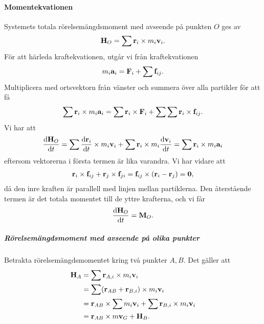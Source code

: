 \paragraph{Momentekvationen}
Systemets totala rörelsemängdsmoment med avseende på punkten $O$ ges av
\begin{align*}
	\vb{H}_{O} = \sum\vb{r}_{i}\times m_{i}\vb{v}_{i}.
\end{align*}
För att härleda kraftekvationen, utgår vi från kraftekvationen
\begin{align*}
	m_{i}\vb{a}_{i} = \vb{F}_{i} + \sum\vb{f}_{ij}.
\end{align*}
Multiplicera med ortsvektorn från vänster och summera över alla partikler för att få
\begin{align*}
	\sum\vb{r}_{i}\times m_{i}\vb{a}_{i} = \sum\vb{r}_{i}\times\vb{F}_{i} + \sum\sum\vb{r}_{i}\times\vb{f}_{ij}.
\end{align*}
Vi har att
\begin{align*}
	\dv{\vb{H}_{O}}{t} = \sum\dv{\vb{r}_{i}}{t}\times m_{i}\vb{v}_{i} + \sum\vb{r}_{i}\times m_{i}\dv{\vb{v}_{i}}{t} = \sum\vb{r}_{i}\times m_{i}\vb{a}_{i}
\end{align*}
eftersom vektorerna i första termen är lika varandra. Vi har vidare att
\begin{align*}
	\vb{r}_{i}\times\vb{f}_{ij} + \vb{r}_{j}\times\vb{f}_{ji} = \vb{f}_{ij}\times (\vb{r}_{i} - \vb{r}_{j}) = \vb{0},
\end{align*}
då den inre kraften är parallell med linjen mellan partiklerna. Den återstående termen är det totala momentet till de yttre krafterna, och vi får
\begin{align*}
	\dv{\vb{H}_{O}}{t} = \vb{M}_{O}.
\end{align*}

\subparagraph{Rörelsemängdsmoment med avseende på olika punkter}
Betrakta rörelsemängdsmomentet kring två punkter $A, B$. Det gäller att
\begin{align*}
	\vb{H}_{A} &= \sum\vb{r}_{A, i}\times m_{i}\vb{v}_{i} \\
	           &= \sum(\vb{r}_{AB} + \vb{r}_{B, i})\times m_{i}\vb{v}_{i} \\
	           &= \vb{r}_{AB}\times\sum m_{i}\vb{v}_{i} + \sum \vb{r}_{B, i}\times m_{i}\vb{v}_{i} \\
	           &= \vb{r}_{AB}\times m\vb{v}_{G} + \vb{H}_{B}.
\end{align*}

